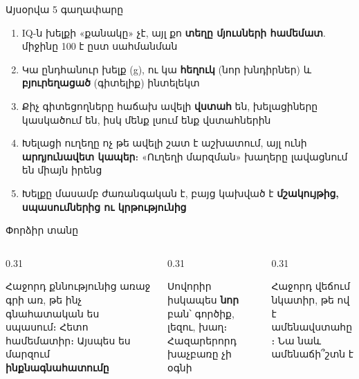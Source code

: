 \notopic

\begin{frame}{Այսօրվա 5 գաղափարը}
  \begin{enumerate}
    \item<1-> IQ-ն խելքի «քանակը» չէ, այլ քո \textbf{տեղը մյուսների համեմատ}. միջինը 100 է ըստ սահմանման
    \item<2-> Կա ընդհանուր խելք (g), ու կա \textbf{հեղուկ} (նոր խնդիրներ) և \textbf{բյուրեղացած} (գիտելիք) ինտելեկտ
    \item<3-> Քիչ գիտեցողները հաճախ ավելի \textbf{վստահ} են, խելացիները կասկածում են, իսկ մենք լսում ենք վստահներին
    \item<4-> Խելացի ուղեղը ոչ թե ավելի շատ է աշխատում, այլ ունի \textbf{արդյունավետ կապեր}։ «Ուղեղի մարզման» խաղերը լավացնում են միայն իրենց
    \item<5-> Խելքը մասամբ ժառանգական է, բայց կախված է \textbf{մշակույթից, սպասումներից ու կրթությունից}
  \end{enumerate}
\end{frame}

\begin{frame}{Փորձիր տանը}
  \begin{columns}[T]
    \begin{column}{0.31\textwidth}
      \begin{card}[colback=mint!30!cardwhite]
        \centering{}\par\smallskip
        \raggedright Հաջորդ քննությունից առաջ գրի առ, թե ինչ գնահատական ես սպասում։ Հետո համեմատիր։ Այսպես ես մարզում \textbf{ինքնագնահատումը}
      \end{card}
    \end{column}
    \begin{column}{0.31\textwidth}
      \begin{card}[colback=lavender!35!cardwhite]
        \centering{}\par\smallskip
        \raggedright Սովորիր իսկապես \textbf{նոր} բան՝ գործիք, լեզու, խաղ։ Հազարերորդ խաչբառը չի օգնի
      \end{card}
    \end{column}
    \begin{column}{0.31\textwidth}
      \begin{card}[colback=peach!35!cardwhite]
        \centering{}\par\smallskip
        \raggedright Հաջորդ վեճում նկատիր, թե ով է ամենավստահը։ Նա նաև ամենաճի՞շտն է
      \end{card}
    \end{column}
  \end{columns}
\end{frame}

